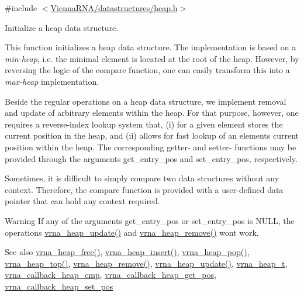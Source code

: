 {\ttfamily \#include $<$\mbox{\hyperlink{heap_8h}{Vienna\+R\+N\+A/datastructures/heap.\+h}}$>$}



Initialize a heap data structure. 

This function initializes a heap data structure. The implementation is based on a {\itshape min-\/heap}, i.\+e. the minimal element is located at the root of the heap. However, by reversing the logic of the compare function, one can easily transform this into a {\itshape max-\/heap} implementation.

Beside the regular operations on a heap data structure, we implement removal and update of arbitrary elements within the heap. For that purpose, however, one requires a reverse-\/index lookup system that, (i) for a given element stores the current position in the heap, and (ii) allows for fast lookup of an elements current position within the heap. The corresponding getter-\/ and setter-\/ functions may be provided through the arguments {\ttfamily get\+\_\+entry\+\_\+pos} and {\ttfamily set\+\_\+entry\+\_\+pos}, respectively.

Sometimes, it is difficult to simply compare two data structures without any context. Therefore, the compare function is provided with a user-\/defined data pointer that can hold any context required.

\begin{DoxyWarning}{Warning}
If any of the arguments {\ttfamily get\+\_\+entry\+\_\+pos} or {\ttfamily set\+\_\+entry\+\_\+pos} is N\+U\+LL, the operations \mbox{\hyperlink{group__heap__utils_gabdd04b8719b3d85c5ad53ed7dec9700b}{vrna\+\_\+heap\+\_\+update()}} and \mbox{\hyperlink{group__heap__utils_ga5e181d5ef8557d502943b938620c7174}{vrna\+\_\+heap\+\_\+remove()}} won\textquotesingle{}t work.
\end{DoxyWarning}
\begin{DoxySeeAlso}{See also}
\mbox{\hyperlink{group__heap__utils_ga2a4915c6e66b8831644857df0715c3ce}{vrna\+\_\+heap\+\_\+free()}}, \mbox{\hyperlink{group__heap__utils_ga91cf0042c894de44c4eb7b47707260a8}{vrna\+\_\+heap\+\_\+insert()}}, \mbox{\hyperlink{group__heap__utils_ga3b6242f3a1194eb1df2d1fb40d630610}{vrna\+\_\+heap\+\_\+pop()}}, \mbox{\hyperlink{group__heap__utils_ga534a8483824371019241e340c026111b}{vrna\+\_\+heap\+\_\+top()}}, \mbox{\hyperlink{group__heap__utils_ga5e181d5ef8557d502943b938620c7174}{vrna\+\_\+heap\+\_\+remove()}}, \mbox{\hyperlink{group__heap__utils_gabdd04b8719b3d85c5ad53ed7dec9700b}{vrna\+\_\+heap\+\_\+update()}}, \mbox{\hyperlink{group__heap__utils_ga341ea87a651145b986792f6eb3e679c3}{vrna\+\_\+heap\+\_\+t}}, \mbox{\hyperlink{group__heap__utils_gac70f1b16e617c57128b1ac9361529795}{vrna\+\_\+callback\+\_\+heap\+\_\+cmp}}, \mbox{\hyperlink{group__heap__utils_ga15f9e17d8168f2d7edc43a282ff44f5e}{vrna\+\_\+callback\+\_\+heap\+\_\+get\+\_\+pos}}, \mbox{\hyperlink{group__heap__utils_ga00acf19f3af4792fb2f3b1d01b32fc61}{vrna\+\_\+callback\+\_\+heap\+\_\+set\+\_\+pos}}
\end{DoxySeeAlso}

